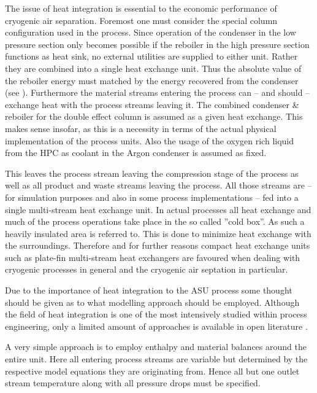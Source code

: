    
    The issue of heat integration is essential to the economic performance of cryogenic air separation. Foremost
    one must consider the special column configuration used in the process. Since operation of the condenser in the
    low pressure section only becomes possible if the reboiler in the high pressure section functions as heat sink,
    no external utilities are supplied to either unit. Rather they are combined into a single heat exchange unit. Thus
    the absolute value of the reboiler energy must matched by the energy recovered from the condenser
    (see ). Furthermore the material streams entering the process can -- and should -- 
    exchange heat with the process streams leaving it. The combined condenser \& reboiler for the double effect column is
    assumed as a given heat exchange. This makes sense insofar, as this is a necessity in terms of the actual physical
    implementation of the process units. Also the usage of the oxygen rich liquid from the HPC as coolant in the Argon
    condenser is assumed as fixed.

    This leaves the process stream leaving the compression stage of the process as well as all product and waste streams
    leaving the process. All those streams are -- for simulation purposes and also in some process implementations  -- fed
    into a single multi-stream heat exchange unit. In actual processes all heat exchange and much of the process operations
    take place in the so called ''cold box''. As such a heavily insulated area is referred to. This is done to minimize
    heat exchange with the surroundings. Therefore and for further reasons compact heat exchange units such as plate-fin
    multi-stream heat exchangers are favoured when dealing with cryogenic processes in general and the cryogenic air septation
    in particular.

    Due to the importance of heat integration to the ASU process some thought should be given as to what modelling approach
    should be employed. Although the field of heat integration is one of the most intensively studied within process engineering,
    only  a limited amount of approaches is available in open literature \cite{Kamath.2012}.

    A very simple approach is to employ enthalpy and material balances around the entire unit.
    Here all entering process streams are variable but determined by the respective model equations they are originating from.
    Hence all but one outlet stream temperature along with all pressure drops must be specified.
